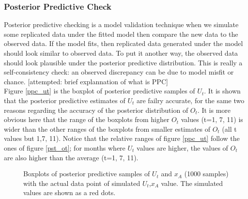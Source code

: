 \documentclass[12pt]{article}
\begin{document}
{\newpage
\subsubsection{Posterior Predictive Check}
Posterior predictive checking is a model validation technique when we simulate some replicated data under the fitted model then compare the new data to the observed data. If the model fits, then replicated data generated under the model should look similar to observed data. To put it another way, the observed data should look plausible under the posterior predictive distribution. This is really a self-consistency check: an observed discrepancy can be due to model misfit or chance. \cite{bda_galman}
[attempted: brief explannation of what is PPC]\\

Figure \ref{ppc_ut} is the boxplot of posterior predictive samples of $U_t$. It is shown that the posterior predictive estimates of $U_t$ are failry accurate, for the same two reasons regarding the accuracy of the posterior distribution of $O_t$. It is more obvious here that the range of the boxplots from higher $O_t$ values (t=1, 7, 11) is wider than the other ranges of the boxplots from smaller estimates of $O_t$ (all t values but 1,7, 11). Notice that the relative ranges of figure \ref{ppc_ut} follow the ones of figure \ref{pst_ot}; for months where $U_t$ values are higher, the values of $O_t$ are also higher than the average (t=1, 7, 11).\\

\begin{figure}[htb]
	\centering
	\caption[Initial result: box plots of predictive posterior samples of $U_t$ and $x_A$]{Boxplots of posterior predictive samples of $U_t$ and $x_A$ (1000 samples) with the actual data point of simulated $U_t$,$x_A$ value. The simulated values are shown as a red dots.}
	

\end{figure}}
\end{document}

